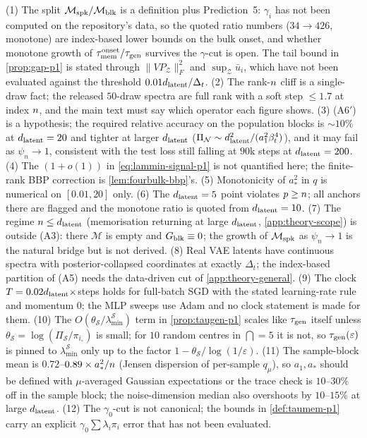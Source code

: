 (1) The split $\mathcal M_{\rm spk}/\mathcal M_{\rm blk}$ is a definition plus Prediction~5: $\gamma_i$ has not been computed on the repository's data, so the quoted ratio numbers ($34\to426$, monotone) are index-based lower bounds on the bulk onset, and whether monotone growth of $\tau_{\mathrm{mem}}^{\rm onset}/\tau_{\mathrm{gen}}$ survives the $\gamma$-cut is open. The tail bound in \cref{prop:gap-p1} is stated through $\|VP_{\mathcal Z}\|_F^2$ and $\sup_{\mathcal Z}\bar u_i$, which have not been evaluated against the threshold $0.01d_{\mathrm{latent}}/\Delta_t$. (2) The rank-$n$ cliff is a single-draw fact; the released $50$-draw spectra are full rank with a soft step $\le1.7$ at index $n$, and the main text must say which operator each figure shows. (3) (A6$'$) is a hypothesis; the required relative accuracy on the population blocks is $\sim10\%$ at $d_{\mathrm{latent}}=20$ and tighter at larger $d_{\mathrm{latent}}$ ($\Pi_{\mathcal N}\sim d_{\mathrm{latent}}^2/(a_1^2\beta_t^4)$), and it may fail as $\psi_n\to1$, consistent with the test loss still falling at $90$k steps at $d_{\mathrm{latent}}=200$. (4) The $(1+o(1))$ in \eqref{eq:lammin-signal-p1} is not quantified here; the finite-rank BBP correction is \cref{lem:fourbulk-bbp}'s. (5) Monotonicity of $a_*^2$ in $q$ is numerical on $[0.01,20]$ only. (6) The $d_{\mathrm{latent}}=5$ point violates $p\ge n$; all anchors there are flagged and the monotone ratio is quoted from $d_{\mathrm{latent}}=10$. (7) The regime $n\le d_{\mathrm{latent}}$ (memorisation returning at large $d_{\mathrm{latent}}$, \cref{app:theory-scope}) is outside (A3): there $\mathcal M$ is empty and $G_{\rm blk}\equiv0$; the growth of $\mathcal M_{\rm spk}$ as $\psi_n\to1$ is the natural bridge but is not derived. (8) Real VAE latents have continuous spectra with posterior-collapsed coordinates at exactly $\Delta_t$; the index-based partition of (A5) needs the data-driven cut of \cref{app:theory-general}. (9) The clock $T=0.02d_{\mathrm{latent}}\times$steps holds for full-batch SGD with the stated learning-rate rule and momentum $0$; the MLP sweeps use Adam and no clock statement is made for them. (10) The $O(\theta_{\mathcal S}/\lambda^{\mathcal S}_{\min})$ term in \cref{prop:taugen-p1} scales like $\tau_{\mathrm{gen}}$ itself unless $\theta_{\mathcal S}=\log(\Pi_{\mathcal S}/\pi_{i_\circ})$ is small; for $10$ random centres in $\dint=5$ it is not, so $\tau_{\mathrm{gen}}(\varepsilon)$ is pinned to $\lambda^{\mathcal S}_{\min}$ only up to the factor $1-\theta_{\mathcal S}/\log(1/\varepsilon)$. (11) The sample-block mean is $0.72$--$0.89\times a_*^2/n$ (Jensen dispersion of per-sample $q_\mu$), so $a_1,a_*$ should be defined with $\mu$-averaged Gaussian expectations or the trace check is $10$--$30\%$ off in the sample block; the noise-dimension median also overshoots by $10$--$15\%$ at large $d_{\mathrm{latent}}$. (12) The $\gamma_0$-cut is not canonical; the bounds in \cref{def:taumem-p1} carry an explicit $\gamma_0\sum\lambda_i\pi_i$ error that has not been evaluated.

